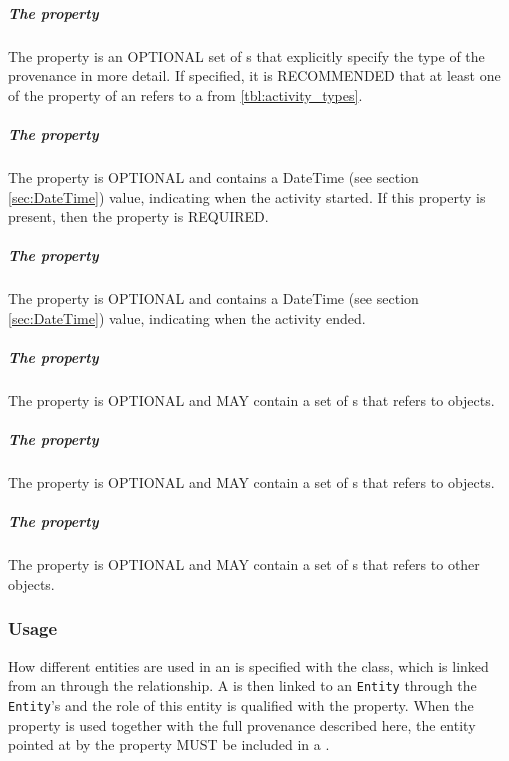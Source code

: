 \subparagraph{The  property}\label{sec:types:Activity}
The  property is an OPTIONAL set of s that explicitly specify the type of the provenance  in more detail. If specified, it is RECOMMENDED that at least one  of the  property of an  refers to a  from \ref{tbl:activity_types}.

\subparagraph{The  property}\label{sec:startedAtTime}
The  property is OPTIONAL and contains a DateTime (see section \ref{sec:DateTime}) value, indicating when the activity started.  If this property is present, then the  property is REQUIRED.

\subparagraph{The  property}\label{sec:endedAtTime}
The  property is OPTIONAL and contains a DateTime (see section \ref{sec:DateTime}) value, indicating when the activity ended.

\subparagraph{The  property}\label{sec:associations}
The  property is OPTIONAL and MAY contain a set of s that refers to  objects.

\subparagraph{The  property}\label{sec:usages}
The  property is OPTIONAL and MAY contain a set of s that refers to  objects.

\subparagraph{The  property}\label{sec:wasInformedBys}
The  property is OPTIONAL and MAY contain a set of s that refers to other  objects.

\subsubsection{Usage}
\label{sec:Usage}
How different entities are used in an  is specified with the  class, which is linked from an  through the  relationship. A  is then linked to an \texttt{Entity} through the \texttt{Entity}'s  and the role of this entity is qualified with the  property. When the  property is used together with the full provenance described here, the entity pointed at by the  property MUST be included in a .

